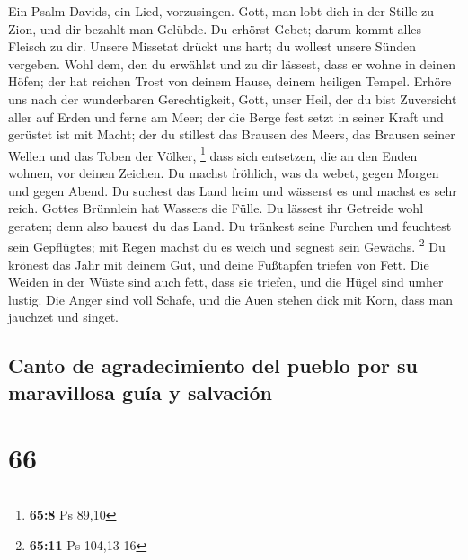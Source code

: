  Ein Psalm Davids, ein Lied, vorzusingen. 
Gott, man lobt dich in der Stille zu Zion, und dir bezahlt man Gelübde.
 Du erhörst Gebet; darum kommt alles Fleisch zu dir.
 Unsere Missetat drückt uns hart; du wollest unsere Sünden
vergeben.  Wohl dem, den du erwählst und zu dir lässest,
dass er wohne in deinen Höfen; der hat reichen Trost von deinem Hause,
deinem heiligen Tempel.  Erhöre uns nach der wunderbaren
Gerechtigkeit, Gott, unser Heil, der du bist Zuversicht aller auf Erden
und ferne am Meer;  der die Berge fest setzt in seiner
Kraft und gerüstet ist mit Macht;  der du stillest das
Brausen des Meers, das Brausen seiner Wellen und das Toben der Völker,
\footnote{\textbf{65:8} Ps 89,10}  dass sich entsetzen,
die an den Enden wohnen, vor deinen Zeichen. Du machst fröhlich, was da
webet, gegen Morgen und gegen Abend.  Du suchest das Land
heim und wässerst es und machst es sehr reich. Gottes Brünnlein hat
Wassers die Fülle. Du lässest ihr Getreide wohl geraten; denn also
bauest du das Land.  Du tränkest seine Furchen und
feuchtest sein Gepflügtes; mit Regen machst du es weich und segnest sein
Gewächs. \footnote{\textbf{65:11} Ps 104,13-16}  Du
krönest das Jahr mit deinem Gut, und deine Fußtapfen triefen von Fett.
 Die Weiden in der Wüste sind auch fett, dass sie
triefen, und die Hügel sind umher lustig.  Die Anger sind
voll Schafe, und die Auen stehen dick mit Korn, dass man jauchzet und
singet.

\hypertarget{canto-de-agradecimiento-del-pueblo-por-su-maravillosa-guuxeda-y-salvaciuxf3n}{%
\subsection{Canto de agradecimiento del pueblo por su maravillosa guía y
salvación}\label{canto-de-agradecimiento-del-pueblo-por-su-maravillosa-guuxeda-y-salvaciuxf3n}}

\hypertarget{section-65}{%
\section{66}\label{section-65}}


